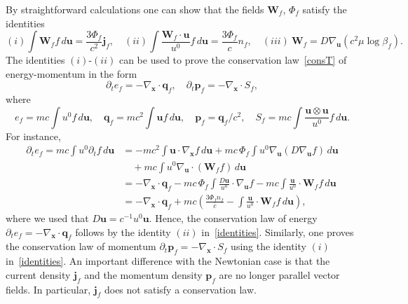\documentclass[12pt]{article}
\theoremstyle{definition}
\numberwithin{equation}{section}
\begin{document}
By straightforward calculations one can show that the fields ${\bm W}_f$, $\Phi_f$ satisfy the identities
\begin{equation}\label{identities}
(i) \int {\bm W}_f f\,d{\bm u}=\frac{3\Phi_f}{c^2}{\bm j}_f,\quad (ii) \int \frac{{\bm W}_f\cdot{\bm u}}{u^0}f\,d{\bm u}=\frac{3\Phi_f}{c}n_f,\quad 
(iii)\ {\bm W}_f=D\nabla_{{\bm u}}\left(c^2\mu\log\beta_f\right).
\end{equation}
The identities $(i)$-$(ii)$ can be used to prove the conservation law~\eqref{consT} of energy-momentum in the form
\[
\partial_t e_f=-\nabla_{\bm x}\cdot{\bm q}_f,\quad \partial_t {\bm p}_f=-\nabla_{\bm x}\cdot S_f,
\]
where
\[
e_f=mc\int u^0f\,d{\bm u},\quad  {\bm q}_f=mc^2\int {\bm u}f\,d{\bm u},\quad
{\bm p}_f={\bm q}_f/c^2,\quad S_f=mc\int \frac{{\bm u}\otimes {\bm u}}{u^0}f\,d{\bm u}.
\]
For instance,
\begin{align*}
\partial_te_f=mc\int u^0\partial_t f\,d{\bm u}&=-mc^2\int {\bm u}\cdot\nabla_{\bm x}f\,d{\bm u}+mc\,\Phi_f\int u^0\nabla_{{\bm u}}(D\nabla_{{\bm u}}f)\,d{\bm u}\\
&\quad +mc\int u^0\nabla_{\bm u}\cdot({\bm W}_ff)\,d{\bm u}\\
&=-\nabla_{\bm x}\cdot{\bm q}_f-mc\,\Phi_f\int\frac{D{\bm u}}{u^0}\cdot\nabla_{{\bm u}}f-mc\int\frac{{\bm u}}{u^0}\cdot{\bm W}_ff\,d{\bm u}\\
&=-\nabla_{\bm x}\cdot{\bm q}_f+mc\left(\frac{3\Phi_f n_f}{c}-\int\frac{{\bm u}}{u^0}\cdot{\bm W}_ff\,d{\bm u}\right),
\end{align*}
where we used that $D{\bm u}=c^{-1}u^0{\bm u}$. Hence, the conservation law of energy $\partial_te_f=-\nabla_{\bm x}\cdot{\bm q}_f$ follows by the identity $(ii)$ in~\eqref{identities}. Similarly, one proves the conservation law of momentum $ \partial_t {\bm p}_f=-\nabla_{\bm x}\cdot S_f$ using the identity $(i)$ in~\eqref{identities}. An important difference with the Newtonian case is that the current density ${\bm j}_f$ and the momentum density ${\bm p}_f$ are no longer parallel vector fields. In particular, ${\bm j}_f$ does not satisfy a conservation law. 
\end{document}

